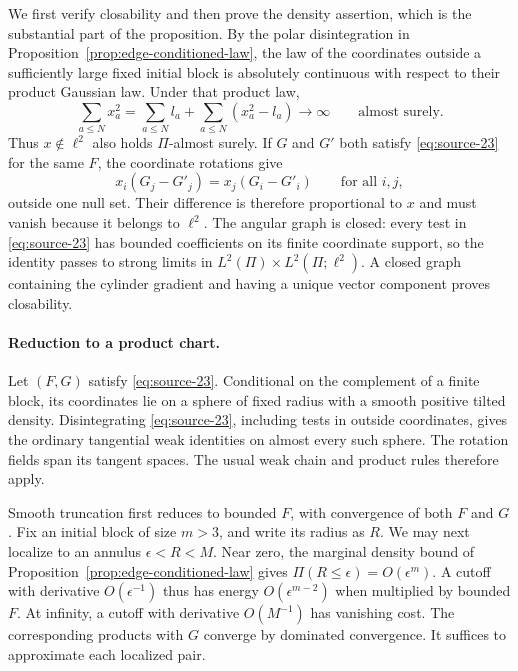 We first verify closability and then prove the density assertion, which is
the substantial part of the proposition. By the polar disintegration in
Proposition~\ref{prop:edge-conditioned-law}, the law of the coordinates
outside a sufficiently large fixed initial block is absolutely continuous with respect to
their product Gaussian law. Under that product law,
\[
 \sum_{a\le N}x_a^2
 =\sum_{a\le N}l_a+\sum_{a\le N}(x_a^2-l_a)\longrightarrow\infty
 \qquad\text{almost surely}.
\]
Thus $x\notin\ell^2$ also holds $\Pi$-almost surely. If $G$ and $G'$ both
satisfy \eqref{eq:source-23} for the same $F$, the coordinate rotations
give
\[
 x_i(G_j-G'_j)=x_j(G_i-G'_i)\qquad\text{for all }i,j,
\]
outside one null set. Their difference is therefore proportional to $x$
and must vanish because it belongs to $\ell^2$. The angular graph is
closed: every test in \eqref{eq:source-23} has bounded coefficients on its
finite coordinate support, so the identity passes to strong limits in
$L^2(\Pi)\times L^2(\Pi;\ell^2)$. A closed graph containing the cylinder
gradient and having a unique vector component proves closability.

\paragraph{Reduction to a product chart.}
Let $(F,G)$ satisfy \eqref{eq:source-23}. Conditional on the complement
of a finite block, its coordinates lie on a sphere of fixed radius with
a smooth positive tilted density. Disintegrating
\eqref{eq:source-23}, including tests in outside coordinates, gives the
ordinary tangential weak identities on almost every such sphere. The
rotation fields span its tangent spaces. The usual weak chain and
product rules therefore apply.

Smooth truncation first reduces to bounded $F$, with convergence of
both $F$ and $G$. Fix an initial block of size $m>3$, and write its
radius as $R$. We may next localize to an annulus
$\epsilon<R<M$. Near zero, the marginal density bound of
Proposition~\ref{prop:edge-conditioned-law} gives
$\Pi(R\le\epsilon)=O(\epsilon^m)$. A cutoff with derivative
$O(\epsilon^{-1})$ thus has energy $O(\epsilon^{m-2})$ when multiplied
by bounded $F$. At infinity, a cutoff with derivative $O(M^{-1})$
has vanishing cost. The corresponding products with $G$ converge by
dominated convergence. It suffices to approximate each localized pair.

